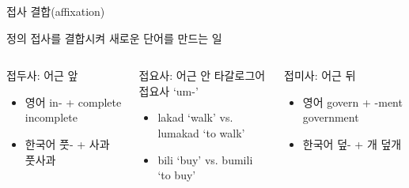 \documentclass[11pt, aspectratio=169]{beamer}
\begin{document}
\begin{frame}[t]{접사 결합(affixation)}
  \begin{block}{정의}
    접사를 결합시켜 새로운 단어를 만드는 일
  \end{block}
  \begin{columns}
    \begin{column}[T]{0.3\textwidth}
      \begin{block}{접두사: 어근 앞}
        \begin{itemize}
          \item 영어 in- + complete \rightarrow incomplete
          \item 한국어 풋- + 사과 \rightarrow 풋사과
        \end{itemize}
      \end{block}
    \end{column}
    \begin{column}[T]{0.3\textwidth}
      \begin{block}{접요사: 어근 안}
        타갈로그어 접요사 ‘um-’
        \begin{itemize}
          \item lakad ‘walk’ vs. lumakad ‘to walk’
          \item bili ‘buy’ vs. bumili ‘to buy’
        \end{itemize}
      \end{block}
    \end{column}
    \begin{column}[T]{0.3\textwidth}
      \begin{block}{접미사: 어근 뒤}
        \begin{itemize}
          \item 영어 govern + -ment \rightarrow government
          \item 한국어 덮- + 개 \rightarrow 덮개
        \end{itemize}
      \end{block}
    \end{column}
  \end{columns}
  
\end{frame}
\end{document}
